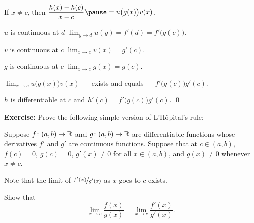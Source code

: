 \documentclass[10pt,aspectratio=149]{beamer}
\begin{document}
\begin{frame}
If $x \not= c$, then
\qquad
$\displaystyle \frac{h(x)-h(c)}{x-c}
\pause
=
u\bigl( g(x) \bigr) v(x)$.

\pause
\medskip

$u$ is continuous at $d$
\wthus
$\displaystyle \lim_{y \to d} u(y) = f'(d) = f'\bigl(g(c)\bigr)$.

\pause
\medskip

$v$ is continuous at $c$
\wthus
$\displaystyle \lim_{x \to c} v(x) = g'(c)$.

\pause
\medskip

$g$ is continuous at $c$
\wthus
$\displaystyle \lim_{x \to c} g(x) = g(c)$.

\pause
\medskip

\thus \quad
$\displaystyle\lim_{x\to c} u\bigl( g(x) \bigr) v(x)$ ~~ exists
\pause
and equals ~~
$f'\bigl(g(c)\bigr) g'(c)$.

\pause
\medskip

\thus \quad $h$ is differentiable at $c$
\pause
and $h'(c) = f'\bigl(g(c)\bigr)g'(c)$.
\qed

\end{frame}

\begin{frame}

\textbf{Exercise:}
Prove the following simple version of L'H\^opital's rule:

\pause
Suppose 
$f \colon (a,b) \to {\mathbb{R}}$ and $g \colon (a,b) \to {\mathbb{R}}$ are differentiable
functions
whose derivatives $f'$ and $g'$ are continuous functions.
\pause
Suppose that at $c \in (a,b)$, $f(c) = 0$, $g(c)=0$,
$g'(x) \not= 0$ for all $x \in (a,b)$, and
$g(x) \not= 0$ whenever $x \not= c$.

\pause
\medskip

Note
that the limit of $\nicefrac{f'(x)}{g'(x)}$ as $x$ goes to $c$ exists.

\pause
\medskip

Show that
\begin{equation*}
\lim_{x \to c} \frac{f(x)}{g(x)} = 
\lim_{x \to c} \frac{f'(x)}{g'(x)} .
\end{equation*}
\end{frame}
\end{document}
